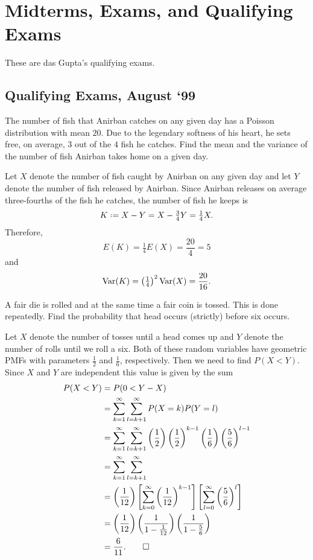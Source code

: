 \section{Midterms, Exams, and Qualifying Exams}
These are das Gupta's qualifying exams.
\subsection{Qualifying Exams, August `99}
\begin{problem}
  The number of fish that Anirban catches on any given day has a Poisson
  distribution with mean \(20\). Due to the legendary softness of his
  heart, he sets free, on average, \(3\) out of the \(4\) fish he
  catches. Find the mean and the variance of the number of fish Anirban
  takes home on a given day.
\end{problem}
\begin{solution*}
  Let \(X\) denote the number of fish caught by Anirban on any given day
  and let \(Y\) denote the number of fish released by Anirban. Since
  Anirban releases on average three-fourths of the fish he catches, the
  number of fish he keeps is
  \[
    K\defeq X-Y=X-\tfrac{3}{4}Y=\tfrac{1}{4}X.
  \]
  Therefore,
  \[
    E(K)=\tfrac{1}{4}E(X)=\frac{20}{4}=5
  \]
  and
  \[
    \operatorname{Var}(K)=\left(\tfrac{1}{4}\right)^2\operatorname{Var}(X)=\frac{20}{16}.
  \]
\end{solution*}

\begin{problem}
  A fair die is rolled and at the same time a fair coin is tossed. This is
  done repeatedly. Find the probability that head occurs (strictly) before
  six occurs.
\end{problem}
\begin{solution*}
  Let \(X\) denote the number of tosses until a head comes up and \(Y\)
  denote the number of rolls until we roll a six. Both of these random
  variables have geometric PMFs with parameters \(\frac{1}{2}\) and
  \(\frac{1}{6}\), respectively. Then we need to find \(P(X<Y)\). Since
  \(X\) and \(Y\) are independent this value is given by the sum
  \begin{align*}
    P(X<Y)
    &=P(0<Y-X)\\
    &=\sum_{k=1}^\infty\sum_{l=k+1}^\infty P(X=k)P(Y=l)\\
    &=\sum_{k=1}^\infty\sum_{l=k+1}^\infty
      \left(\frac{1}{2}\right)\left(\frac{1}{2}\right)^{k-1}
      \left(\frac{1}{6}\right)\left(\frac{5}{6}\right)^{l-1}\\
    &=\sum_{k=1}^\infty\sum_{l=k+1}^\infty\\
    &=\left(\frac{1}{12}\right)
     \left[\sum_{k=0}^\infty
      \left(\frac{1}{12}\right)^{k-1}
      \right]
      \left[\sum_{l=0}^\infty \left(\frac{5}{6}\right)^l\right]\\
    &=\left(\frac{1}{12}\right)
      \left(\frac{1}{1-\frac{1}{12}}\right)
      \left(\frac{1}{1-\frac{5}{6}}\right)\\
    &=\frac{6}{11}.\qedhere
  \end{align*}
\end{solution*}


